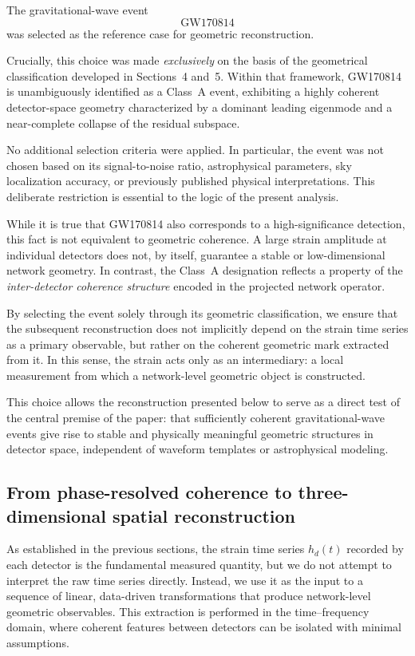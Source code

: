 \documentclass[11pt,a4paper]{article}
\begin{document}
The gravitational-wave event
\[
\text{GW170814}
\]
was selected as the reference case for geometric reconstruction.

Crucially, this choice was made \emph{exclusively} on the basis of the geometrical
classification developed in Sections~4 and~5.
Within that framework, GW170814 is unambiguously identified as a Class~A event, exhibiting
a highly coherent detector-space geometry characterized by a dominant leading eigenmode
and a near-complete collapse of the residual subspace.

No additional selection criteria were applied.
In particular, the event was not chosen based on its signal-to-noise ratio, astrophysical
parameters, sky localization accuracy, or previously published physical interpretations.
This deliberate restriction is essential to the logic of the present analysis.

While it is true that GW170814 also corresponds to a high-significance detection, this fact
is not equivalent to geometric coherence.
A large strain amplitude at individual detectors does not, by itself, guarantee a stable
or low-dimensional network geometry.
In contrast, the Class~A designation reflects a property of the \emph{inter-detector
coherence structure} encoded in the projected network operator.

By selecting the event solely through its geometric classification, we ensure that the
subsequent reconstruction does not implicitly depend on the strain time series as a
primary observable, but rather on the coherent geometric mark extracted from it.
In this sense, the strain acts only as an intermediary: a local measurement from which a
network-level geometric object is constructed.

This choice allows the reconstruction presented below to serve as a direct test of the
central premise of the paper:
that sufficiently coherent gravitational-wave events give rise to stable and physically
meaningful geometric structures in detector space, independent of waveform templates or
astrophysical modeling.

\subsection{From phase-resolved coherence to three-dimensional spatial reconstruction}
\label{sec:phase_subspaces}

As established in the previous sections, the strain time series $h_d(t)$ recorded by each detector
is the fundamental measured quantity, but we do not attempt to interpret the raw time series directly.
Instead, we use it as the input to a sequence of linear, data-driven transformations that produce
network-level geometric observables.
This extraction is performed in the time--frequency domain, where coherent features
between detectors can be isolated with minimal assumptions.
\end{document}
